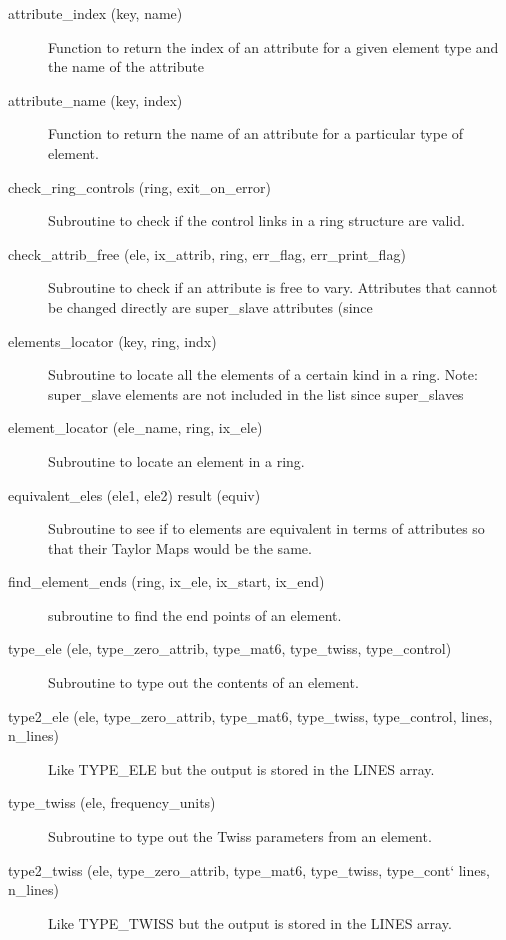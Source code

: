 \begin{description}

\item[attribute\_index (key, name)] \Newline
Function to return the index of an attribute for a given element type and the name of the attribute 

\item[attribute\_name (key, index)] \Newline
Function to return the name of an attribute for a particular type of element. 

\item[check\_ring\_controls (ring, exit\_on\_error)] \Newline
Subroutine to check if the control links in a ring structure are valid. 

\item[check\_attrib\_free (ele, ix\_attrib, ring, err\_flag, err\_print\_flag)] \Newline
Subroutine to check if an attribute is free to vary. Attributes that cannot be changed directly are super\_slave attributes (since 

\item[elements\_locator (key, ring, indx)] \Newline
Subroutine to locate all the elements of a certain kind in a ring. Note: super\_slave elements are not included in the list since super\_slaves 

\item[element\_locator (ele\_name, ring, ix\_ele)] \Newline
Subroutine to locate an element in a ring. 

\item[equivalent\_eles (ele1, ele2) result (equiv)] \Newline 
     Subroutine to see if to elements are equivalent in terms of attributes so
     that their Taylor Maps would be the same. 

\item[find\_element\_ends (ring, ix\_ele, ix\_start, ix\_end)] \Newline
subroutine to find the end points of an element. 

\item[type\_ele (ele, type\_zero\_attrib, type\_mat6, type\_twiss, type\_control)] \Newline
Subroutine to type out the contents of an element. 

\item[type2\_ele (ele, type\_zero\_attrib, type\_mat6, type\_twiss, type\_control, lines, n\_lines)] \Newline
Like TYPE\_ELE but the output is stored in the LINES array. 

\item[type\_twiss (ele, frequency\_units)] \Newline
Subroutine to type out the Twiss parameters from an element. 

\item[type2\_twiss (ele, type\_zero\_attrib, type\_mat6, type\_twiss, type\_cont` lines, n\_lines)] \Newline
Like TYPE\_TWISS but the output is stored in the LINES array. 

\end{description}

